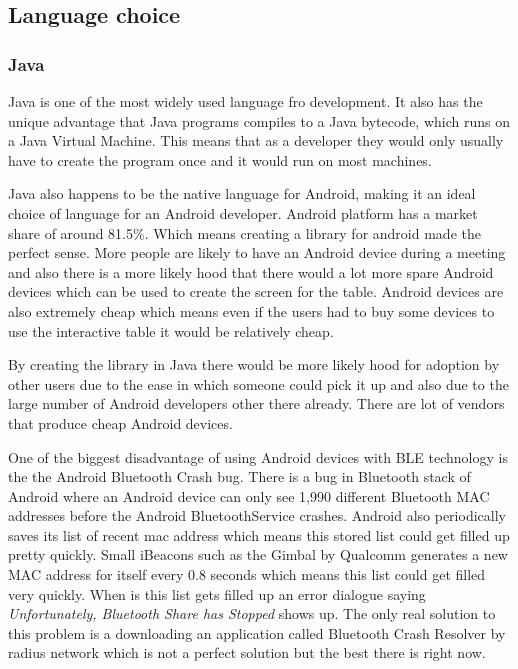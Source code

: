 \subsection{Language choice}


\subsubsection{Java}

Java is one of the most widely used language fro development. It also
has the unique advantage that Java programs compiles to a Java bytecode,
which runs on a Java Virtual Machine. This means that as a developer
they would only usually have to create the program once and it would
run on most machines. 

Java also happens to be the native language for Android, making it
an ideal choice of language for an Android developer. Android platform
has a market share of around 81.5\%\cite{market-share}. Which means
creating a library for android made the perfect sense. More people
are likely to have an Android device during a meeting and also there
is a more likely hood that there would a lot more spare Android devices
which can be used to create the screen for the table. Android devices
are also extremely cheap which means even if the users had to buy
some devices to use the interactive table it would be relatively cheap.

By creating the library in Java there would be more likely hood for
adoption by other users due to the ease in which someone could pick
it up and also due to the large number of Android developers other
there already. There are lot of vendors that produce cheap Android
devices\cite{cheap-android}. 

One of the biggest disadvantage of using Android devices with BLE
technology is the the Android Bluetooth Crash bug\cite{bluetooth-share}.
There is a bug in Bluetooth stack of Android where an Android device
can only see 1,990 different Bluetooth MAC addresses before the Android
BluetoothService crashes. Android also periodically saves its list
of recent mac address which means this stored list could get filled
up pretty quickly. Small iBeacons such as the Gimbal by Qualcomm generates
a new MAC address for itself every 0.8 seconds which means this list
could get filled very quickly. When is this list gets filled up an
error dialogue saying \emph{Unfortunately, Bluetooth Share
has Stopped} shows up. The only real solution to this
problem is a downloading an application called Bluetooth Crash Resolver by radius
network which is not a perfect solution but the best there is right
now.


